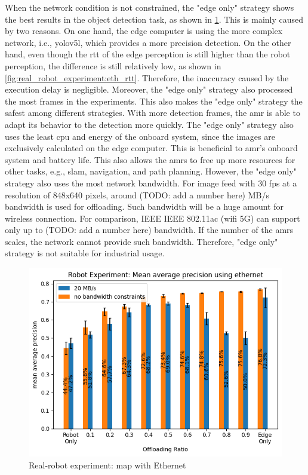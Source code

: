 When the network condition is not constrained, the "edge only" strategy shows the best results in the object detection task, as shown in \cref{fig:real_robot_experiment:eth_map}. This is mainly caused by two reasons. On one hand, the edge computer is using the more complex network, i.e., \gls{yolov5}l, which provides a more precision detection. On the other hand, even though the \gls{rtt} of the edge perception is still higher than the robot perception, the difference is still relatively low, as shown in \cref{fig:real_robot_experiment:eth_rtt}. Therefore, the inaccuracy caused by the execution delay is negligible. Moreover, the "edge only" strategy also processed the most frames in the experiments. This also makes the "edge only" strategy the safest among different strategies. With more detection frames, the \gls{amr} is able to adapt its behavior to the detection more quickly. The "edge only" strategy also uses the least \gls{cpu} and energy of the onboard system, since the images are exclusively calculated on the edge computer. This is beneficial to \gls{amr}'s onboard system and battery life. This also allows the \glspl{amr} to free up more resources for other tasks, e.g., \gls{slam}, navigation, and path planning. However, the "edge only" strategy also uses the most network bandwidth. For image feed with 30 \gls{fps} at a resolution of 848x640 pixels, around (TODO: add a number here) MB/s bandwidth is used for offloading. Such bandwidth will be a huge amount for wireless connection. For comparison, IEEE IEEE 802.11ac (\gls{wifi} 5G) can support only up to (TODO: add a number here) bandwidth. If the number of the \glspl{amr} scales, the network cannot provide such bandwidth. Therefore, "edge only" strategy is not suitable for industrial usage. 

\begin{figure}
    \centering
    \includegraphics[width=\linewidth]{figures/experiment/real_robot/eth/map.png}
    \caption{Real-robot experiment: \gls{map} with Ethernet}
    \label{fig:real_robot_experiment:eth_map}
\end{figure}

